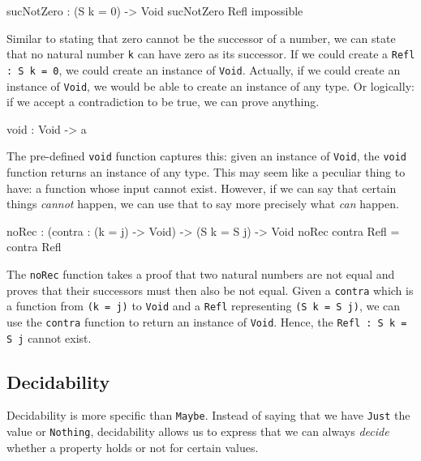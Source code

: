         \begin{code}[label={idr:snz}, caption={The successor of a natural number cannot be zero}]
        sucNotZero : (S k = 0) -> Void
        sucNotZero Refl impossible
        \end{code}
        Similar to stating that zero cannot be the successor of a number, we can state that no natural number \texttt{k} can have zero as its successor. If we could create a\linebreak
        \texttt{Refl : S k = 0}, we could create an instance of \texttt{Void}. Actually, if we could create an instance of \texttt{Void}, we would be able to create an instance of any type. Or logically: if we accept a contradiction to be true, we can prove anything.
    
    
        \begin{code}[caption={The \texttt{void} function}]
        void : Void -> a
        \end{code}
    
        The pre-defined \texttt{void} function captures this: given an instance of \texttt{Void}, the \texttt{void} function returns an instance of any type. This may seem like a peculiar thing to have: a function whose input cannot exist. However, if we can say that certain things \textit{cannot} happen, we can use that to say more precisely what \textit{can} happen.
        
        \begin{code}[label={des:no-rec}, caption={Applying a function to an impossibility does not make it possible}]
        noRec : (contra : (k = j) -> Void) -> (S k = S j) -> Void
        noRec contra Refl = contra Refl
        \end{code}
        
        The \texttt{noRec} function takes a proof that two natural numbers are not equal and proves that their successors must then also be not equal. Given a \texttt{contra} which is a function from \texttt{(k = j)} to \texttt{Void} and a \texttt{Refl} representing\linebreak
        \texttt{(S k = S j)}, we can use the \texttt{contra} function to return an instance of \texttt{Void}. Hence, the
        \texttt{Refl : S k = S j} cannot exist.
    
    \subsection{Decidability}
        Decidability is more specific than \texttt{Maybe}. Instead of saying that we have \texttt{Just} the value or \texttt{Nothing}, decidability allows us to express that we can always \textit{decide} whether a property holds or not for certain values.
    
